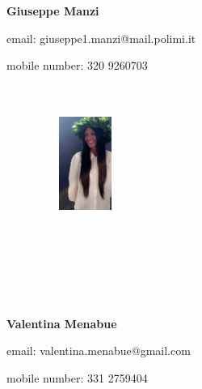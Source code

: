 \documentclass[a4paper,11pt]{report}
\begin{document}
\par\textbf{Giuseppe Manzi}\par
email: giuseppe1.manzi@mail.polimi.it\par
mobile number: 320 9260703
\\~\\~\par
\begin{figure} 
    \includegraphics[width=1.2in,height=1.2in,clip,keepaspectratio]{images/Menabue.jpeg}
\end{figure}\par
\\~\\~\\~\\~\par\textbf{Valentina Menabue}\par
email: valentina.menabue@gmail.com\par
mobile number: 331 2759404
\tableofcontents
\end{document}
